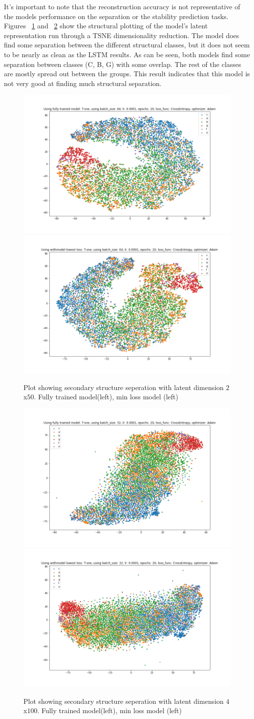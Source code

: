\noindent
It's important to note that the reconstruction accuracy is not representative of the models performance on the separation or the stability prediction tasks.\\

\noindent
Figures ~\ref{fig:plot_50} and ~\ref{fig:plot_100} show the structural plotting of the model's latent representation run through a TSNE dimensionality reduction. The model does find some separation between the different structural classes, but it does not seem to be nearly as clean as the LSTM results. As can be seen, both models find some separation between classes (C, B, G) with some overlap. The rest of the classes are mostly spread out between the groups. This result indicates that this model is not very good at finding much structural separation. \\

\begin{figure}[!ht]
  \centering
  \includegraphics[width=0.4\linewidth]{latex/imgs/last_50.png}
  \includegraphics[width=0.4\linewidth]{latex/imgs/best_50.png}
  \caption{Plot showing secondary structure seperation with latent dimension $2$x$50$. Fully trained model(left), min loss model (left)}
  \label{fig:plot_50}
\end{figure}

\begin{figure}[!ht]
  \centering
  \includegraphics[width=0.4\linewidth]{latex/imgs/last_100.png}
  \includegraphics[width=0.4\linewidth]{latex/imgs/best_100.png}
  \caption{Plot showing secondary structure seperation with latent dimension $4$x$100$. Fully trained model(left), min loss model (left)}
  \label{fig:plot_100}
\end{figure}

